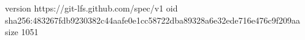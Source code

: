 version https://git-lfs.github.com/spec/v1
oid sha256:483267fdb9230382c44aafe0e1cc58722dba89328a6e32ede716e476c9f209aa
size 1051
